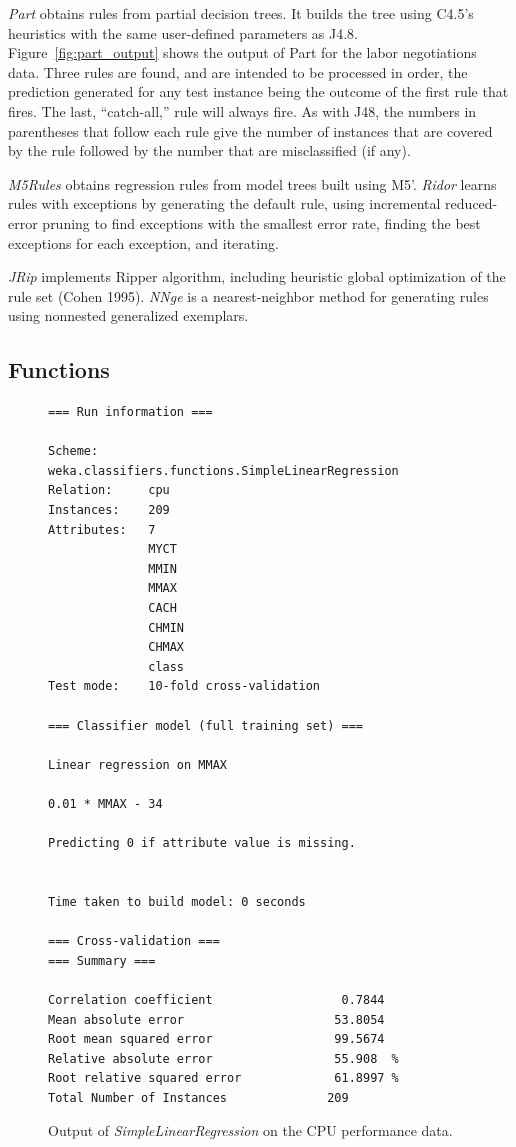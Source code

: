 \textit{Part} obtains rules from partial decision trees. It builds the
tree using C4.5's heuristics with the same user-defined parameters as
J4.8. Figure~\ref{fig:part_output} shows the output of Part for the
labor negotiations data. Three rules are found, and are intended to be
processed in order, the prediction generated for any test instance
being the outcome of the first rule that fires. The last, ``catch-all,''
rule will always fire. As with J48, the numbers in parentheses that
follow each rule give the number of instances that are covered by the
rule followed by the number that are misclassified (if any).

\textit{M5Rules} obtains regression rules from model trees built using
M5'. \textit{Ridor} learns rules with exceptions by generating the
default rule, using incremental reduced-error pruning to find
exceptions with the smallest error rate, finding the best exceptions
for each exception, and iterating.

\textit{JRip} implements Ripper algorithm, including heuristic global
optimization of the rule set (Cohen 1995). \textit{NNge} is a
nearest-neighbor method for generating rules using nonnested
generalized exemplars.

\subsection{Functions}

\begin{figure}[!hp]
\begin{mdframed}[innermargin=-1.5cm]
\begin{Verbatim}[fontsize=\footnotesize]
=== Run information ===

Scheme:       weka.classifiers.functions.SimpleLinearRegression 
Relation:     cpu
Instances:    209
Attributes:   7
              MYCT
              MMIN
              MMAX
              CACH
              CHMIN
              CHMAX
              class
Test mode:    10-fold cross-validation

=== Classifier model (full training set) ===

Linear regression on MMAX

0.01 * MMAX - 34

Predicting 0 if attribute value is missing.


Time taken to build model: 0 seconds

=== Cross-validation ===
=== Summary ===

Correlation coefficient                  0.7844
Mean absolute error                     53.8054
Root mean squared error                 99.5674
Relative absolute error                 55.908  %
Root relative squared error             61.8997 %
Total Number of Instances              209 
\end{Verbatim}
\end{mdframed}
\caption{\label{fig:simple_linear_regression_output}Output of \textit{SimpleLinearRegression} on the CPU performance data.}
\end{figure}

